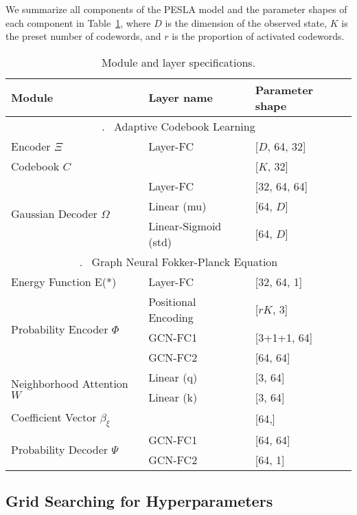 We summarize all components of the PESLA model and the parameter shapes of each component in Table~\ref{tab:module_layers}, where $D$ is the dimension of the observed state, $K$ is the preset number of codewords, and $r$ is the proportion of activated codewords.

\begin{table}[!ht]
    \centering
    \caption{Module and layer specifications.}
    \label{tab:module_layers}
    \renewcommand{\arraystretch}{1.4}
    \begin{tabular}{|p{4cm}|p{4cm}|p{4cm}|}
        \hline
        \textbf{Module} & \textbf{Layer name} & \textbf{Parameter shape} \\
        \hline
        \multicolumn{3}{c}{\romannumeral 1. \ Adaptive Codebook Learning} \\
        \hline
        Encoder $\Xi$ & Layer-FC & [$D$, 64, 32] \\
        \hline
        Codebook $C$ &  & [$K$, 32] \\
        \hline
        \multirow{3}{*}{Gaussian Decoder $\Omega$} & Layer-FC & [32, 64, 64] \\
         & Linear (mu) & [64, $D$] \\
         & Linear-Sigmoid (std) & [64, $D$] \\
        \hline
        \multicolumn{3}{c}{\romannumeral 2. \ Graph Neural Fokker-Planck Equation} \\
        \hline
        Energy Function E(*) & Layer-FC & [32, 64, 1] \\
        \hline
        \multirow{3}{*}{Probability Encoder $\Phi$} & Positional Encoding & [$rK$, 3] \\
         & GCN-FC1 & [3+1+1, 64] \\
         & GCN-FC2 & [64, 64] \\
        \hline
        \multirow{2}{*}{Neighborhood Attention $W$} & Linear (q) & [3, 64] \\
         & Linear (k) & [3, 64] \\
        \hline
        Coefficient Vector $\beta_\xi$ & & [64,] \\
        \hline
        \multirow{2}{*}{Probability Decoder $\Psi$} & GCN-FC1 & [64, 64] \\
         & GCN-FC2 & [64, 1] \\
        \hline
    \end{tabular}
\end{table}


\subsection{Grid Searching for Hyperparameters} \label{app:grid_search}

